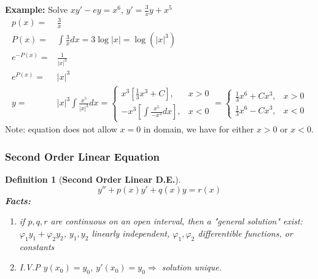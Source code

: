 \documentclass[12pt]{article}
\theoremstyle{plain}
\newtheorem{definition}{Definition}[subsection]
\newcommand{\abs}[1]{\left| #1 \right|}
\renewcommand{\phi}{\varphi}
\begin{document}
	
	{\color{Brown}
	\textbf{Example: }
	Solve $xy' - ey = x^6$, $y' = \frac 3x y + x^5$ 
	\begin{align*}
		p(x) =& \frac 3x \tag{not defined at $x = 0$}\\
		P(x) =& \int \frac 3x dx = 3\log \abs x 
		=\log (\abs x ^3)     \qquad \tag{did not worry about C}\\
		e^{-P(x)} =& \frac1{\abs x^3}\\
		e^{P(x)} =& \abs x^3 \\
		y =& \abs x^3 \int \frac{x^5}{\abs x^3}dx = 
		\begin{cases}
			x^3 [\frac 13 x^3 + C], & x>0\\
			-x^3 [\int \frac{x^5}{-x^3} dx], & x < 0
		\end{cases}
		=
		\begin{cases}
			\frac 13 x^6 + Cx^3, & x>0\\
			\frac 13 x^6 - Cx^3, & x<0
		\end{cases}
	\end{align*}
	Note: equation does not allow $x =0$ in domain, we have for either $x>0$
	or $x<0$. 
	}
	
	\subsubsection{Second Order Linear Equation}

	\begin{definition}[\textbf{Second Order Linear D.E.}]
		\[
			y'' + p(x)y' + q(x) y = r(x) 
		\]
		\textbf{Facts:} 
		\begin{enumerate}
		\item 
		if $p,q,r$ are continuous on an open interval, then a 
		"general solution" exist: $\varphi_1 y_1 + \varphi_2 y_2$, 
		$y_1, y_2$ linearly independent, $\phi_1, \phi_2$ differentible 
		functions, or constants
		\item
			I.V.P $y(x_0) = y_0$, $y'(x_0) = y_0 \Rightarrow$ solution unique.\\
		\end{enumerate}
	\end{definition}
	
\end{document}
